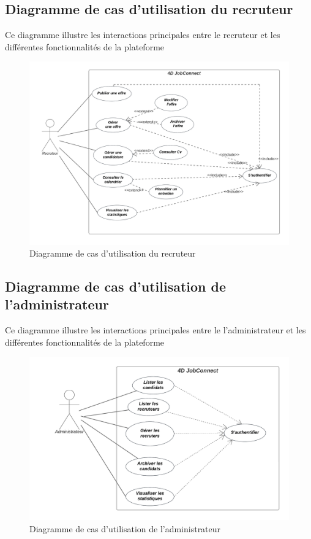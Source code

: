 \subsection{Diagramme de cas d’utilisation du recruteur}
Ce diagramme illustre les interactions principales entre le 
recruteur et les différentes fonctionnalités de la plateforme
\begin{figure}[h]
    \centering
    \includegraphics[scale=0.16]{Images/uc rec.png} %
    \caption{Diagramme de cas d’utilisation du recruteur}
    \label{fig:UCRecruteur}
\end{figure}
\vspace{12cm}

\subsection{Diagramme de cas d’utilisation de l'administrateur}
Ce diagramme illustre les interactions principales entre le 
l’administrateur et les différentes fonctionnalités de la plateforme
\begin{figure}[htbp]
    \centering
    \includegraphics[scale=0.2]{Images/admin uc.png} %
    \caption{Diagramme de cas d’utilisation de l'administrateur}
    \label{fig:UCAdmin}
\end{figure}
\vspace{1cm}

